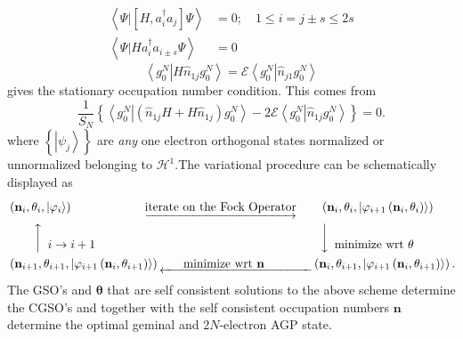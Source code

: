 \documentclass[aps,preprint]{revtex4}%
\begin{document}
\begin{align}
\left\langle \left.  \Psi\right\vert \left[  H,a_{i}^{\dagger}a_{j}\right]
\Psi\right\rangle  &  =0;\quad1\leq i=j\pm s\leq2s\\
\left\langle \left.  \Psi\right\vert Ha_{i}^{\dagger}a_{i\pm s}\Psi
\right\rangle  &  =0
\end{align}%
\begin{equation}
\left\langle g_{0}^{N}\right.  \left\vert H\hat{n}_{1j}g_{0}^{N}\right\rangle
=\mathcal{E}\left\langle g_{0}^{N}\right.  \left\vert \hat{n}_{j1}g_{0}%
^{N}\right\rangle
\end{equation}
gives the stationary occupation number condition. This comes from
\begin{equation}
\frac{1}{S_{N}}\left\{  \left\langle g_{0}^{N}\right.  \left\vert \left(
\hat{n}_{1j}H+H\hat{n}_{1j}\right)  g_{0}^{N}\right\rangle -2\mathcal{E}%
\left\langle g_{0}^{N}\right.  \left\vert \hat{n}_{1j}g_{0}^{N}\right\rangle
\right\}  =0.
\end{equation}
where $\left\{  \left\vert \psi_{j}\right\rangle \right\}  $ are \emph{any
}one electron orthogonal states normalized or unnormalized belonging to
$\mathcal{H}^{1}.$The variational procedure can be schematically displayed as
\begin{align}
&  \left(  \mathbf{n}_{i},\mathbf{\theta}_{i}\mathbf{,}\left\vert
\mathbf{\varphi}_{i}\right\rangle \right)  \overset{\text{ }}{\qquad
\qquad\qquad\underrightarrow{\text{iterate on the Fock Operator}}\qquad\left(
\mathbf{n}_{i},\mathbf{\theta}_{i}\mathbf{,}\left\vert \mathbf{\varphi}%
_{i+1}\left(  \mathbf{n}_{i},\mathbf{\theta}_{i}\right)  \right\rangle
\right)  }\nonumber\\
&  \qquad\left\uparrow
\begin{array}
[c]{c}%
\\
i\rightarrow i+1\\
\end{array}
\right.  \qquad\qquad\qquad\qquad\qquad\qquad\qquad\qquad\qquad
\left\downarrow
\begin{array}
[c]{c}%
\\
\text{minimize wrt }\mathbf{\theta}\\
\end{array}
\right. \nonumber\\
&  \left(  \mathbf{n}_{i+1},\mathbf{\theta}_{i+1}\mathbf{,}\left\vert
\mathbf{\varphi}_{i+1}\left(  \mathbf{n}_{i},\mathbf{\theta}_{i+1}\right)
\right\rangle \right)  \underleftarrow{\qquad\text{minimize wrt }%
\mathbf{n}\qquad\qquad}\left(  \mathbf{n}_{i},\mathbf{\theta}_{i+1}%
\mathbf{,}\left\vert \mathbf{\varphi}_{i+1}\left(  \mathbf{n}_{i}%
,\mathbf{\theta}_{i+1}\right)  \right\rangle \right)  .
\end{align}
The GSO's and $\mathbf{\theta}$ that are self consistent solutions to the
above scheme determine the CGSO's and together with the self consistent
occupation numbers $\mathbf{n}$ determine the optimal geminal and
$2N$-electron AGP state.
\end{document}
